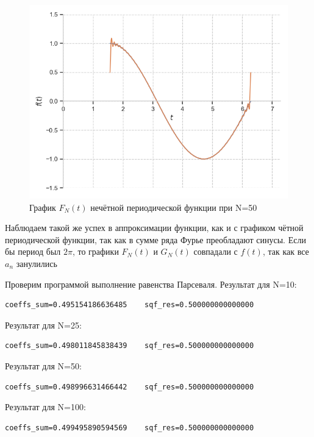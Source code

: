 \documentclass[a4paper, 16pt]{article}
\begin{document}
\begin{figure}[!htb]
    \centering
    \includegraphics[scale=0.8]{fur_sin_n=50.png}
    \captionsetup{skip=0pt}
    \caption{График $F_N(t)$ нечётной периодической функции при N=50}
    \label{Рис:28}
\end{figure}


\noindent Наблюдаем такой же успех в аппроксимации функции, как и с графиком чётной периодической функции,
так как в сумме ряда Фурье преобладают синусы. Если бы период был $2\pi$, то графики $F_N(t)$ и $G_N(t)$
совпадали с $f(t)$, так как все $a_n$ занулились


\newpage
\noindent Проверим программой выполнение равенства Парсеваля. Результат для N=10:
\begin{lstlisting}
coeffs_sum=0.495154186636485    sqf_res=0.500000000000000
\end{lstlisting}


\noindent Результат для N=25:
\begin{lstlisting}
coeffs_sum=0.498011845838439    sqf_res=0.500000000000000
\end{lstlisting}


\noindent Результат для N=50:
\begin{lstlisting}
coeffs_sum=0.498996631466442    sqf_res=0.500000000000000
\end{lstlisting}


\noindent Результат для N=100:
\begin{lstlisting}
coeffs_sum=0.499495890594569    sqf_res=0.500000000000000
\end{lstlisting}
\end{document}
